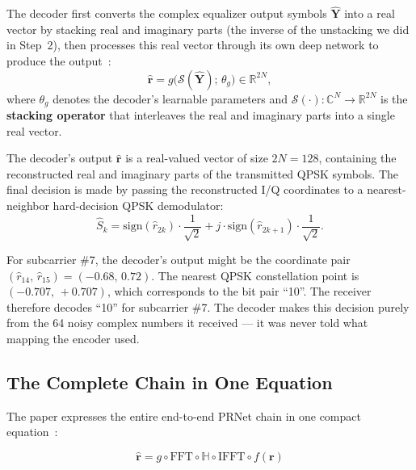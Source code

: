 The decoder first converts the complex equalizer output symbols $\hat{\bm{Y}}$ into a real vector by stacking real and imaginary parts (the inverse of the unstacking we did in Step~2), then processes this real vector through its own deep network to produce the output~\cite{kim2017novel}:
\begin{equation*}
    \hat{\bm{r}} = g\bigl(\mathcal{S}(\hat{\bm{Y}});\,\theta_g\bigr)
    \in \mathbb{R}^{2N},
\end{equation*}
where $\theta_g$ denotes the decoder's learnable parameters and $\mathcal{S}(\cdot) : \mathbb{C}^{N} \to \mathbb{R}^{2N}$ is the \textbf{stacking operator} that interleaves the real and imaginary parts into a single real vector.

The decoder's output $\hat{\bm{r}}$ is a real-valued vector of size $2N = 128$, containing the reconstructed real and imaginary parts of the transmitted QPSK symbols. The final decision is made by passing the reconstructed I/Q coordinates to a nearest-neighbor hard-decision QPSK demodulator:
\begin{equation*}
    \hat{S}_k = \mathrm{sign}(\hat{r}_{2k}) \cdot \frac{1}{\sqrt{2}} + j \cdot \mathrm{sign}(\hat{r}_{2k+1}) \cdot \frac{1}{\sqrt{2}}.
\end{equation*}

\begin{workingexample}
    For subcarrier \#7, the decoder's output might be the coordinate pair $(\hat{r}_{14},\, \hat{r}_{15}) = (-0.68,\, 0.72)$.  The nearest QPSK constellation point is $(-0.707,\, +0.707)$, which corresponds to the bit pair ``10''. The receiver therefore decodes ``10'' for subcarrier \#7. The decoder makes this decision purely from the 64 noisy complex numbers it received --- it was never told what mapping the encoder used.
\end{workingexample}


\subsection{The Complete Chain in One Equation}

The paper expresses the entire end-to-end PRNet chain in one compact equation~\cite{kim2017novel}:
\begin{keyresult}
    \begin{equation}
        \hat{\bm{r}}
        = g \circ \mathrm{FFT} \circ \mathbb{H} \circ \mathrm{IFFT}
        \circ f(\bm{r})
    \end{equation}
\end{keyresult}

